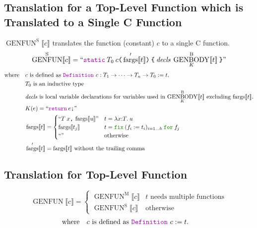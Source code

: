 \documentclass[a4paper,fleqn]{article}
\newcommand{\kwDefinition}{\mbox{\color{myviolet}\ttfamily Definition}}
\newcommand{\kwfix}{\mbox{\color{mygreen}\ttfamily fix}}
\newcommand{\kwfor}{\mbox{\color{mygreen}\ttfamily for}}
\newcommand{\lamT}[3]{\lambda #1\mathord{:}#2.\:#3}
\newcommand{\fix}[4]{\kwfix\:(#1 := #2)_{#3}\:\kwfor\:#4}
\newcommand{\BRA}[1]{\llbracket #1 \rrbracket}
\DeclareMathOperator{\genbody}{GENBODY}
\newcommand{\genbodyb}[2]{\genbody^\mathrm{B}_{#1}\BRA{#2}}
\DeclareMathOperator{\genfunop}{GENFUN}
\newcommand{\genfun}[1]{\genfunop\BRA{#1}}
\newcommand{\genfuns}[1]{\genfunop^\mathrm{S}\BRA{#1}}
\newcommand{\genfunm}[1]{\genfunop^\mathrm{M}\BRA{#1}}
\newcommand{\dq}[1]{\text{``}#1\text{''}}
\newcommand{\ttparen}[1]{\texttt{(}#1\texttt{)}}
\newcommand{\ttlbrace}{\texttt{\char '173}}
\newcommand{\ttrbrace}{\texttt{\char '175}}
\newcommand{\ttbrace}[1]{\ttlbrace#1\ttrbrace}
\newcommand{\ttsemi}{\texttt{;}}
\newcommand{\ttcomma}{\texttt{,}}
\newcommand{\kwCreturn}{\mbox{\color{myviolet}\ttfamily return}}
\newcommand{\kwstatic}{\mbox{\color{myviolet}\ttfamily static}}
\DeclareMathOperator{\fargsop}{fargs}
\newcommand{\fargs}[1]{\fargsop\BRA{#1}}
\newcommand{\fargsd}[1]{\fargsop'\BRA{#1}}
\begin{document}
\subsection{Translation for a Top-Level Function which is Translated to a Single C Function}\label{sec:genfuns}
\raggedright
$\genfuns{c}$ translates the function (constant) $c$ to a single C function.
\[
  \genfuns{c} = \dq{\kwstatic\:T_0\:c\ttparen{\fargsd{t}}\:\ttbrace{\:\mathit{decls}\:\genbodyb{K}{t}\:}}
\]
\[ \text{where} \quad
  \begin{aligned}[t]
    & \text{$c$ is defined as \kwDefinition~$c : T_1 \rightarrow \dotsb \rightarrow T_n \rightarrow T_0 := t.$} \\
    & \text{$T_0$ is an inductive type} \\
    & \text{$\mathit{decls}$ is local variable declarations for variables used in $\genbodyb{K}{t}$ excluding $\fargs{t}$.} \\
    & K(e) = \dq{\kwCreturn\:e\ttsemi} \\
    & \fargs{t} =
      \begin{cases}
        \dq{T\:x\ttcomma\:\fargs{u}}      & t = \lamT{x}{T}{u} \\
        \fargs{t_j}       & t = \fix{f_i}{t_i}{i=1\ldots h}{f_j} \\
        \dq{}    & \text{otherwise}
      \end{cases} \\
    & \fargsd{t} = \fargs{t}~\text{without the trailing comma}
  \end{aligned}
\]

\subsection{Translation for Top-Level Function}\label{sec:genfun}
\raggedright
\[
  \genfun{c} =
  \begin{cases}
    \genfunm{c} & \text{$t$ needs multiple functions} \\
    \genfuns{c} & \text{otherwise}
  \end{cases}
\]
\[ \text{where} \quad
  \begin{aligned}[t]
    & \text{$c$ is defined as \kwDefinition~$c := t.$}
  \end{aligned}
\]



\end{document}
